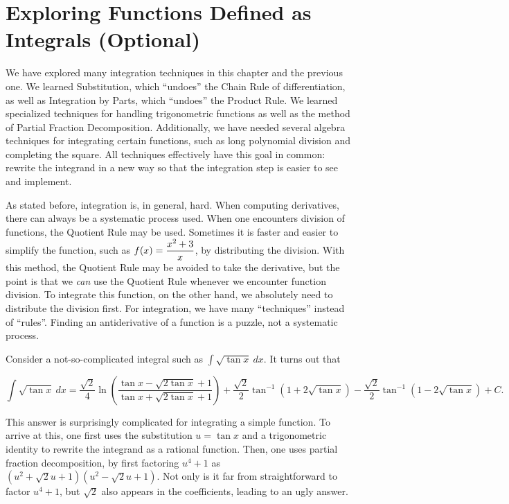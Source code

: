 \section{Exploring Functions Defined as Integrals (Optional)}\label{sec:nonelem}

We have explored many integration techniques in this chapter and the previous one. We learned Substitution, which ``undoes'' the Chain Rule of differentiation, as well as Integration by Parts, which ``undoes'' the Product Rule. We learned specialized techniques for handling trigonometric functions as well as the method of Partial Fraction Decomposition.  Additionally, we have needed several algebra techniques for integrating certain functions, such as long polynomial division and completing the square.  All techniques effectively have this goal in common: rewrite the integrand in a new way so that the integration step is easier to see and implement. 

As stated before, integration is, in general, hard.  When computing derivatives, there can always be a systematic process used.  When one encounters division of functions, the Quotient Rule may be used.  Sometimes it is faster and easier to simplify the function, such as $\displaystyle f(x)=\frac{x^2+3}{x}$, by distributing the division.  With this method, the Quotient Rule may be avoided to take the derivative, but the point is that we \emph{can} use the Quotient Rule whenever we encounter function division.  To integrate this function, on the other hand, we absolutely need to distribute the division first.  For integration, we have many ``techniques'' instead of ``rules''.  Finding an antiderivative of a function is a puzzle, not a systematic process.

Consider a not-so-complicated integral such as $\int \sqrt{\tan x}\ dx$.  It turns out that

\begin{footnotesize}
$$
\int \sqrt{\tan x}\ dx = \frac{\sqrt{2}}{4} \ln \left(   \frac{\tan x -\sqrt{2\tan x} + 1}{\tan x +\sqrt{2\tan x} + 1}  \right)
+\frac{\sqrt{2}}{2} \tan^{-1} \left(1+2\sqrt{\tan x} \right)
-\frac{\sqrt{2}}{2} \tan^{-1} \left(1-2\sqrt{\tan x} \right)
+C.
$$
\end{footnotesize}

This answer is surprisingly complicated for integrating a simple function.  To arrive at this, one first uses the substitution $u=\tan x$ and a trigonometric identity to rewrite the integrand as a rational function.  Then, one uses partial fraction decomposition, by first factoring
$u^4+1$ as $\left(u^2 + \sqrt{2} u +1\right) \left(u^2 - \sqrt{2} u +1\right)$.  Not only is it far from straightforward to factor $u^4+1$, but $\sqrt{2}$ also appears in the coefficients, leading to an ugly answer.

